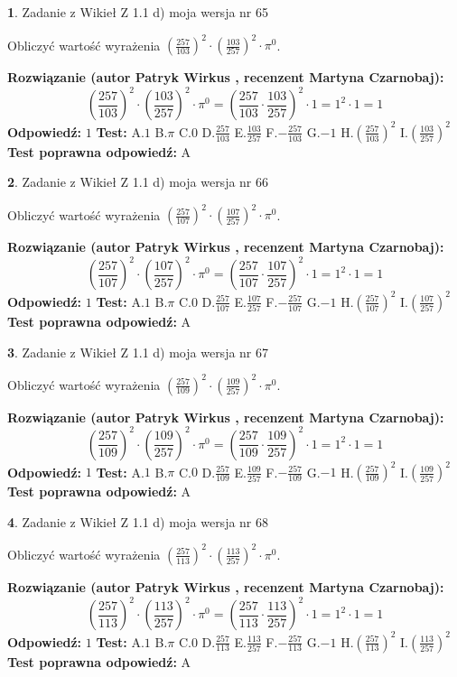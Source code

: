 \documentclass[12pt, a4paper]{article}
\theoremstyle{definition} %
\newtheorem{zad}{}
\newcommand{\zadStart}[1]{\begin{zad}#1\newline}
\newcommand{\zadStop}{\end{zad}}
\newcommand{\rozwStart}[2]{\noindent \textbf{Rozwiązanie (autor #1 , recenzent #2): }\newline}
\newcommand{\rozwStop}{\newline}
\newcommand{\odpStart}{\noindent \textbf{Odpowiedź:}\newline}
\newcommand{\odpStop}{\newline}
\newcommand{\testStart}{\noindent \textbf{Test:}\newline}
\newcommand{\testStop}{\newline}
\newcommand{\kluczStart}{\noindent \textbf{Test poprawna odpowiedź:}\newline}
\newcommand{\kluczStop}{\newline}
\begin{document}
\zadStart{Zadanie z Wikieł Z 1.1 d) moja wersja nr 65}

Obliczyć wartość wyrażenia $(\frac{257}{103})^{2} \cdot (\frac{103}{257})^{2} \cdot \pi^{0}$.
\zadStop
\rozwStart{Patryk Wirkus}{Martyna Czarnobaj}
$$(\frac{257}{103})^{2} \cdot (\frac{103}{257})^{2} \cdot \pi^{0} = (\frac{257}{103} \cdot \frac{103}{257})^{2} \cdot 1 = 1^{2} \cdot 1 = 1$$
\rozwStop
\odpStart
$1$
\odpStop
\testStart
A.$1$ B.$\pi$ C.$0$ D.$\frac{257}{103}$ E.$\frac{103}{257}$
F.$-\frac{257}{103}$ G.$-1$
H.$(\frac{257}{103})^{2}$
I.$(\frac{103}{257})^{2}$
\testStop
\kluczStart
A
\kluczStop



\zadStart{Zadanie z Wikieł Z 1.1 d) moja wersja nr 66}

Obliczyć wartość wyrażenia $(\frac{257}{107})^{2} \cdot (\frac{107}{257})^{2} \cdot \pi^{0}$.
\zadStop
\rozwStart{Patryk Wirkus}{Martyna Czarnobaj}
$$(\frac{257}{107})^{2} \cdot (\frac{107}{257})^{2} \cdot \pi^{0} = (\frac{257}{107} \cdot \frac{107}{257})^{2} \cdot 1 = 1^{2} \cdot 1 = 1$$
\rozwStop
\odpStart
$1$
\odpStop
\testStart
A.$1$ B.$\pi$ C.$0$ D.$\frac{257}{107}$ E.$\frac{107}{257}$
F.$-\frac{257}{107}$ G.$-1$
H.$(\frac{257}{107})^{2}$
I.$(\frac{107}{257})^{2}$
\testStop
\kluczStart
A
\kluczStop



\zadStart{Zadanie z Wikieł Z 1.1 d) moja wersja nr 67}

Obliczyć wartość wyrażenia $(\frac{257}{109})^{2} \cdot (\frac{109}{257})^{2} \cdot \pi^{0}$.
\zadStop
\rozwStart{Patryk Wirkus}{Martyna Czarnobaj}
$$(\frac{257}{109})^{2} \cdot (\frac{109}{257})^{2} \cdot \pi^{0} = (\frac{257}{109} \cdot \frac{109}{257})^{2} \cdot 1 = 1^{2} \cdot 1 = 1$$
\rozwStop
\odpStart
$1$
\odpStop
\testStart
A.$1$ B.$\pi$ C.$0$ D.$\frac{257}{109}$ E.$\frac{109}{257}$
F.$-\frac{257}{109}$ G.$-1$
H.$(\frac{257}{109})^{2}$
I.$(\frac{109}{257})^{2}$
\testStop
\kluczStart
A
\kluczStop



\zadStart{Zadanie z Wikieł Z 1.1 d) moja wersja nr 68}

Obliczyć wartość wyrażenia $(\frac{257}{113})^{2} \cdot (\frac{113}{257})^{2} \cdot \pi^{0}$.
\zadStop
\rozwStart{Patryk Wirkus}{Martyna Czarnobaj}
$$(\frac{257}{113})^{2} \cdot (\frac{113}{257})^{2} \cdot \pi^{0} = (\frac{257}{113} \cdot \frac{113}{257})^{2} \cdot 1 = 1^{2} \cdot 1 = 1$$
\rozwStop
\odpStart
$1$
\odpStop
\testStart
A.$1$ B.$\pi$ C.$0$ D.$\frac{257}{113}$ E.$\frac{113}{257}$
F.$-\frac{257}{113}$ G.$-1$
H.$(\frac{257}{113})^{2}$
I.$(\frac{113}{257})^{2}$
\testStop
\kluczStart
A
\kluczStop
\end{document}

